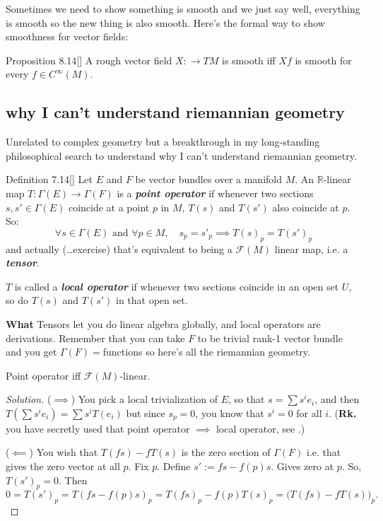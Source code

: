 Sometimes we need to show something is smooth and we just say well, everything is smooth so the new thing is also smooth. Here's the formal way to show smoothness for vector fields:

\begin{thing7}{Proposition 8.14}[\cite{les}]\leavevmode
A rough vector field \(X : \to TM\) is smooth iff \(Xf\) is smooth for every \(f\in C^\infty(M)\).
\end{thing7}

\subsection{why I can't understand riemannian geometry}

Unrelated to complex geometry but a breakthrough in my long-standing philosophical search to understand why I can't understand riemannian geometry.

\begin{thing4}{Definition 7.14}[\cite{tud}]\label{def:7.14}\leavevmode
Let \(E\) and \(F\) be vector bundles over a manifold \(M\). An \(\mathbb{R}\)-linear map \(T:\Gamma(E)\longrightarrow \Gamma(F)\) is a \textit{\textbf{point operator}} if whenever two sections \(s,s' \in \Gamma(E)\) coincide at a point \(p\) in \(M\), \(T(s)\) and \(T(s')\) also coincide at \(p\). So:
\[\forall s \in \Gamma(E)\text{ and } \forall  p \in M, \quad s_p=s'_p \implies T(s)_p=T(s')_p\]
and actually (…exercise) that's equivalent to being a \(\mathcal{F}(M)\) linear map, i.e. a \textit{\textbf{tensor}}.

\(T\) is called a \textit{\textbf{local operator}} if whenever two sections coincide in an open set \(U\), so do \(T(s)\) and  \(T(s')\) in that open set.

{\color{2}\bfseries What}\hspace{.5em} Tensors let you do linear algebra globally, and local operators are derivations. Remember that you can take \(F\) to be trivial rank-1 vector bundle and you get \(\Gamma(F)=\)functions so here's all the riemannian geometry.
\end{thing4}

\begin{exercise}\leavevmode
Point operator iff \(\mathcal{F}(M)\)-linear.
\end{exercise}

\begin{proof}[Solution]\leavevmode
(\(\implies\)) You pick a local trivialization of \(E\), so that \(s=\sum s^ie_i\), and then
\(T\left(\sum s^ie_i\right)=\sum s^i T(e_i)\) but since \(s_p=0\), you know that \(s^i=0\) for all \(i\). (\textbf{Rk.}  you have secretly used that point operator \(\implies\) local operator, see \cite{tud}.)

(\(\impliedby\)) You wish that \(T(fs)-fT(s)\) is the zero section of  \(\Gamma(F)\) i.e. that gives the zero vector at all \(p\). Fix \(p\). Define \(s':=fs - f(p)s\). Gives zero at \(p\). So, \(T(s')_p=0\). Then
 \[0=T(s')_p=T(fs-f(p)s)_p=T(fs)_p-f(p)T(s)_p=\Big(T(fs)-fT(s)\Big)_p.\]

\end{proof}

